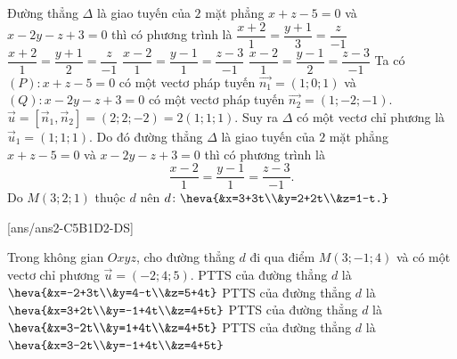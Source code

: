 \begin{ex}%
	Đường thẳng $\Delta$ là giao tuyến của $2$ mặt phẳng $x+z-5=0$ và $x-2y-z+3=0$ thì có phương trình là
	\choice
	{$\dfrac{x+2}{1}=\dfrac{y+1}{3}=\dfrac{z}{-1}$}
	{$\dfrac{x+2}{1}=\dfrac{y+1}{2}=\dfrac{z}{-1}$}
	{\True $\dfrac{x-2}{1}=\dfrac{y-1}{1}=\dfrac{z-3}{-1}$}
	{$\dfrac{x-2}{1}=\dfrac{y-1}{2}=\dfrac{z-3}{-1}$}
	\loigiai
	{
		Ta có $(P)\colon x+z-5=0$ có một vectơ pháp tuyến $\overrightarrow{n_{1}}=(1;0;1)$ và $(Q)\colon x-2y-z+3=0$ có một vectơ pháp tuyến $\overrightarrow{n_{2}}=(1;-2;-1)$.\\
		$\vec{u}=\left[\overrightarrow{n}_{1},\overrightarrow{n}_{2}\right]=(2;2;-2)=2(1;1;1)$.
		Suy ra $\Delta$ có một vectơ chỉ phương là $\vec{u}_{1}=(1;1;1)$.
		Do đó đường thẳng $\Delta$ là giao tuyến của $2$ mặt phẳng $x+z-5=0$ và $x-2y-z+3=0$ thì có phương trình là 
		$$\dfrac{x-2}{1}=\dfrac{y-1}{1}=\dfrac{z-3}{-1}.$$
		Do $M(3;2;1)$ thuộc $d$ nên $d\colon\heva{&x=3+3t\\&y=2+2t\\&z=1-t.}$
	}
\end{ex}
\TNTF
{}[ans/ans2-C5B1D2-DS]
\setcounter{ex}{13}%
\begin{ex}%
	Trong không gian $Oxyz$, cho đường thẳng $d$ đi qua điểm $M(3;-1;4)$ và có một vectơ chỉ phương $\vec{u}=(-2;4;5)$. 
	\choiceTF
	{PTTS của đường thẳng $d$ là $\heva{&x=-2+3t\\&y=4-t\\&z=5+4t}$}
	{PTTS của đường thẳng $d$ là $\heva{&x=3+2t\\&y=-1+4t\\&z=4+5t}$}
	{PTTS của đường thẳng $d$ là $\heva{&x=3-2t\\&y=1+4t\\&z=4+5t}$}
	{\True PTTS của đường thẳng $d$ là $\heva{&x=3-2t\\&y=-1+4t\\&z=4+5t}$}
\end{ex}
